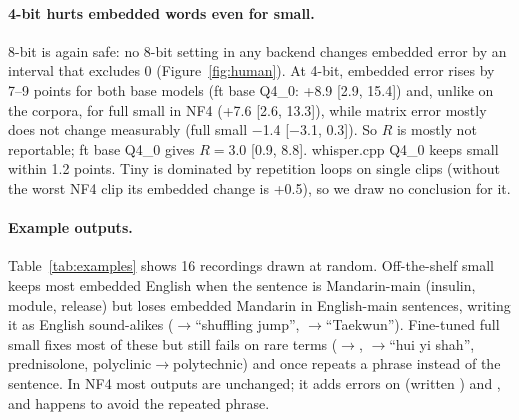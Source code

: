 \paragraph{4-bit hurts embedded words even for small.}
8-bit is again safe: no 8-bit setting in any backend changes embedded error by an interval that excludes 0 (Figure~\ref{fig:human}). At 4-bit, embedded error rises by 7--9 points for both base models (ft base Q4\_0: +8.9 [2.9, 15.4]) and, unlike on the corpora, for full small in NF4 (+7.6 [2.6, 13.3]), while matrix error mostly does not change measurably (full small $-$1.4 [$-$3.1, 0.3]). So $R$ is mostly not reportable; ft base Q4\_0 gives $R=3.0$ [0.9, 8.8]. whisper.cpp Q4\_0 keeps small within 1.2 points. Tiny is dominated by repetition loops on single clips (without the worst NF4 clip its embedded change is +0.5), so we draw no conclusion for it.

\paragraph{Example outputs.}
Table~\ref{tab:examples} shows 16 recordings drawn at random. Off-the-shelf small keeps most embedded English when the sentence is Mandarin-main (insulin, module, release) but loses embedded Mandarin in English-main sentences, writing it as English sound-alikes ($\rightarrow$``shuffling jump'', $\rightarrow$``Taekwun''). Fine-tuned full small fixes most of these but still fails on rare terms ($\rightarrow$, $\rightarrow$``hui yi shah'', prednisolone, polyclinic$\rightarrow$polytechnic) and once repeats a phrase instead of the sentence. In NF4 most outputs are unchanged; it adds errors on  (written ) and , and happens to avoid the repeated phrase.


